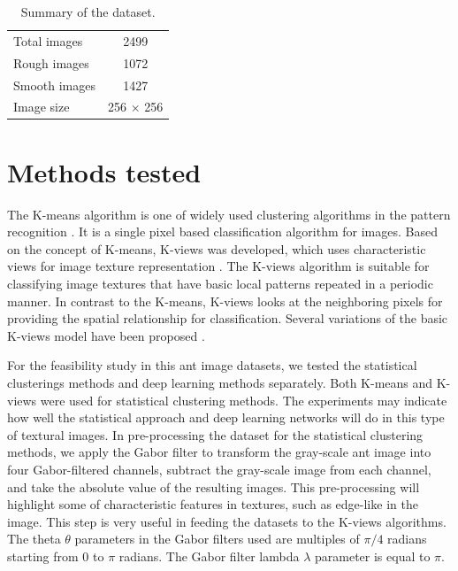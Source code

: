 \documentclass{aci}
\numberwithin{equation}{section}
\begin{document}
\begin{table}[h]
    \centering
    \caption{Summary of the dataset.}
    \begin{tabular}{|l|c|}
        \toprule
        Total images  & 2499             \\
        Rough images  & 1072             \\
        Smooth images & 1427             \\
        Image size    & 256 $\times$ 256 \\
        \bottomrule
    \end{tabular}
    \label{tab:dataset-summary}
\end{table}

\section{Methods tested}


The K-means algorithm is one of widely used clustering algorithms in the pattern
recognition \cite{lloyd_least_1982}. It is a single pixel based classification
algorithm for images. Based on the concept of K-means, K-views was developed,
which uses characteristic views for image texture representation
\cite{hung_use_2002}. The K-views algorithm is suitable for classifying image
textures that have basic local patterns repeated in a periodic manner. In
contrast to the K-means, K-views looks at the neighboring pixels for providing
the spatial relationship for classification.  Several variations of the basic
K-views model have been proposed \cite{yang_image_2003, lan_improved_2010}.

For the feasibility study in this ant image datasets, we tested the statistical
clusterings methods and deep learning methods separately. Both K-means and
K-views were used for statistical clustering methods. The experiments may
indicate how well the statistical approach and deep learning networks will do in
this type of textural images. In pre-processing the dataset for the statistical
clustering methods, we apply the Gabor filter to transform the gray-scale ant
image into four Gabor-filtered channels, subtract the gray-scale image from each
channel, and take the absolute value of the resulting images. This
pre-processing will highlight some of characteristic features in textures, such
as edge-like in the image. This step is very useful in feeding the datasets to
the K-views algorithms. The theta $\theta$ parameters in the Gabor filters used
are multiples of $\pi/4$ radians starting from $0$ to $\pi$ radians. The Gabor
filter lambda $\lambda$ parameter is equal to $\pi$.
\end{document}
